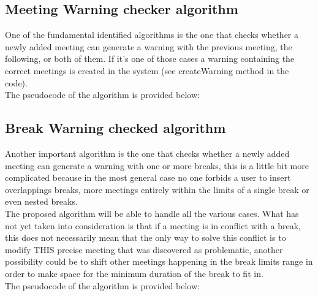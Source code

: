 \subsection{Meeting Warning checker algorithm}

One of the fundamental identified algorithms is the one that checks whether a newly added meeting can generate a warning with the previous meeting, the following, or both of them.
If it's one of those cases a warning containing the correct meetings is created in the system (see createWarning method in the code).
\\
The pseudocode of the algorithm is provided below:
\\



\subsection{Break Warning checked algorithm}

Another important algorithm is the one that checks whether a newly added meeting can generate a warning with one or more breaks, this is a little bit more complicated because in the most general case no one forbids a user to insert overlappings breaks, more meetings entirely within the limits of a single break or even nested breaks.
\\The proposed algorithm will be able to handle all the various cases. What has not yet taken into consideration is that if a meeting is in conflict with a break, this does not necessarily mean that the only way to solve this conflict is to modify THIS precise meeting that was discovered as problematic, another possibility could be to shift other meetings happening in the break limits range in order to make space for the minimum duration of the break to fit in.
\\
The pseudocode of the algorithm is provided below:
\\


